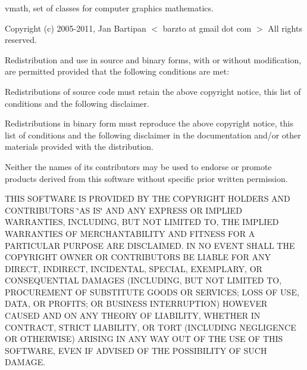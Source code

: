 vmath, set of classes for computer graphics mathematics.

Copyright (c) 2005-\/2011, Jan Bartipan $<$ barzto at gmail dot com $>$ All rights reserved.

Redistribution and use in source and binary forms, with or without modification, are permitted provided that the following conditions are met:


\begin{DoxyItemize}
\item Redistributions of source code must retain the above copyright notice, this list of conditions and the following disclaimer.
\item Redistributions in binary form must reproduce the above copyright notice, this list of conditions and the following disclaimer in the documentation and/or other materials provided with the distribution.
\item Neither the names of its contributors may be used to endorse or promote products derived from this software without specific prior written permission.
\end{DoxyItemize}

THIS SOFTWARE IS PROVIDED BY THE COPYRIGHT HOLDERS AND CONTRIBUTORS \char`\"{}AS IS\char`\"{} AND ANY EXPRESS OR IMPLIED WARRANTIES, INCLUDING, BUT NOT LIMITED TO, THE IMPLIED WARRANTIES OF MERCHANTABILITY AND FITNESS FOR A PARTICULAR PURPOSE ARE DISCLAIMED. IN NO EVENT SHALL THE COPYRIGHT OWNER OR CONTRIBUTORS BE LIABLE FOR ANY DIRECT, INDIRECT, INCIDENTAL, SPECIAL, EXEMPLARY, OR CONSEQUENTIAL DAMAGES (INCLUDING, BUT NOT LIMITED TO, PROCUREMENT OF SUBSTITUTE GOODS OR SERVICES; LOSS OF USE, DATA, OR PROFITS; OR BUSINESS INTERRUPTION) HOWEVER CAUSED AND ON ANY THEORY OF LIABILITY, WHETHER IN CONTRACT, STRICT LIABILITY, OR TORT (INCLUDING NEGLIGENCE OR OTHERWISE) ARISING IN ANY WAY OUT OF THE USE OF THIS SOFTWARE, EVEN IF ADVISED OF THE POSSIBILITY OF SUCH DAMAGE. 